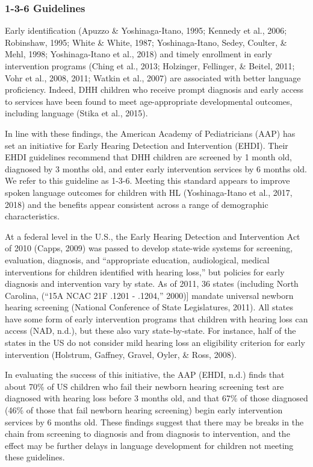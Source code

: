 \documentclass[english,man]{apa6}
\begin{document}
\hypertarget{guidelines}{%
\subsubsection{1-3-6 Guidelines}\label{guidelines}}

Early identification (Apuzzo \& Yoshinaga-Itano, 1995; Kennedy et al., 2006; Robinshaw, 1995; White \& White, 1987; Yoshinaga-Itano, Sedey, Coulter, \& Mehl, 1998; Yoshinaga-Itano et al., 2018) and timely enrollment in early intervention programs (Ching et al., 2013; Holzinger, Fellinger, \& Beitel, 2011; Vohr et al., 2008, 2011; Watkin et al., 2007) are associated with better language proficiency. Indeed, DHH children who receive prompt diagnosis and early access to services have been found to meet age-appropriate developmental outcomes, including language (Stika et al., 2015).

In line with these findings, the American Academy of Pediatricians (AAP) has set an initiative for Early Hearing Detection and Intervention (EHDI). Their EHDI guidelines recommend that DHH children are screened by 1 month old, diagnosed by 3 months old, and enter early intervention services by 6 months old. We refer to this guideline as 1-3-6. Meeting this standard appears to improve spoken language outcomes for children with HL (Yoshinaga-Itano et al., 2017, 2018) and the benefits appear consistent across a range of demographic characteristics.

At a federal level in the U.S., the Early Hearing Detection and Intervention Act of 2010 (Capps, 2009) was passed to develop state-wide systems for screening, evaluation, diagnosis, and \enquote{appropriate education, audiological, medical interventions for children identified with hearing loss,} but policies for early diagnosis and intervention vary by state. As of 2011, 36 states (including North Carolina, (``15A NCAC 21F .1201 - .1204,'' 2000){]} mandate universal newborn hearing screening (National Conference of State Legislatures, 2011). All states have some form of early intervention programs that children with hearing loss can access (NAD, n.d.), but these also vary state-by-state. For instance, half of the states in the US do not consider mild hearing loss an eligibility criterion for early intervention (Holstrum, Gaffney, Gravel, Oyler, \& Ross, 2008).

In evaluating the success of this initiative, the AAP (EHDI, n.d.) finds that about 70\% of US children who fail their newborn hearing screening test are diagnosed with hearing loss before 3 months old, and that 67\% of those diagnosed (46\% of those that fail newborn hearing screening) begin early intervention services by 6 months old. These findings suggest that there may be breaks in the chain from screening to diagnosis and from diagnosis to intervention, and the effect may be further delays in language development for children not meeting these guidelines.
\end{document}
